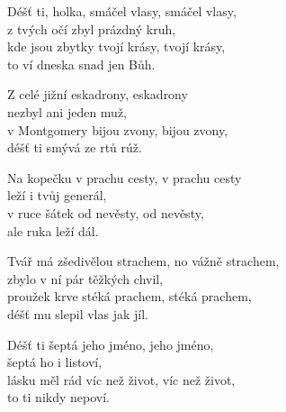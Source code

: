 
\ve{}
Déšť ti, holka, smáčel vlasy, smáčel vlasy,\\
z tvých očí zbyl prázdný kruh,\\
kde jsou zbytky tvojí krásy, tvojí krásy,\\
to ví dneska snad jen Bůh.

\cho{}
Z celé jižní eskadrony, eskadrony\\
nezbyl ani jeden muž,\\
v Montgomery bijou zvony, bijou zvony,\\
déšť ti smývá ze rtů rúž.

\ve{}
Na kopečku v prachu cesty, v prachu cesty\\
leží i tvůj generál,\\
v ruce šátek od nevěsty, od nevěsty,\\
ale ruka leží dál.

\cho{}

\ve{}
Tvář má zšedivělou strachem, no vážně strachem,\\
zbylo v ní pár těžkých chvil,\\
proužek krve stéká prachem, stéká prachem,\\
déšť mu slepil vlas jak jíl.

\cho{}

\ve{}
Déšť ti šeptá jeho jméno, jeho jméno,\\
šeptá ho i listoví,\\
lásku měl rád víc než život, víc než život,\\
to ti nikdy nepoví.

\cho{}

\esong